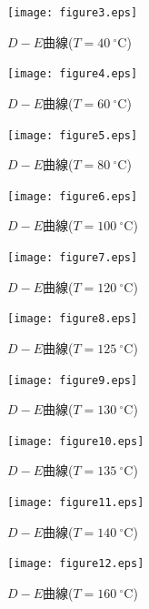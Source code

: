 \documentclass[a4paper,10.5pt]{ltjsarticle}
\begin{document}
\begin{figure}[htbp]
  \begin{minipage}[t]{0.30\linewidth}
    \centering
    \texttt{[image: figure3.eps]}
    \caption{$D-E$曲線($T=40\ ^\circ \mathrm{C}$)}
  \end{minipage}
  \begin{minipage}[t]{0.30\linewidth}
    \centering
    \texttt{[image: figure4.eps]}
    \caption{$D-E$曲線($T=60\ ^\circ \mathrm{C}$)}
  \end{minipage}
  \begin{minipage}[t]{0.30\linewidth}
    \centering
    \texttt{[image: figure5.eps]}
    \caption{$D-E$曲線($T=80\ ^\circ \mathrm{C}$)}
  \end{minipage}

  \begin{minipage}[t]{0.30\linewidth}
    \centering
    \texttt{[image: figure6.eps]}
    \caption{$D-E$曲線($T=100\ ^\circ \mathrm{C}$)}
  \end{minipage}
  \begin{minipage}[t]{0.30\linewidth}
    \centering
    \texttt{[image: figure7.eps]}
    \caption{$D-E$曲線($T=120\ ^\circ \mathrm{C}$)}
  \end{minipage}
  \begin{minipage}[t]{0.30\linewidth}
    \centering
    \texttt{[image: figure8.eps]}
    \caption{$D-E$曲線($T=125\ ^\circ \mathrm{C}$)}
  \end{minipage}

  \begin{minipage}[t]{0.30\linewidth}
    \centering
    \texttt{[image: figure9.eps]}
    \caption{$D-E$曲線($T=130\ ^\circ \mathrm{C}$)}
  \end{minipage}
  \begin{minipage}[t]{0.30\linewidth}
    \centering
    \texttt{[image: figure10.eps]}
    \caption{$D-E$曲線($T=135\ ^\circ \mathrm{C}$)}
  \end{minipage}
  \begin{minipage}[t]{0.30\linewidth}
    \centering
    \texttt{[image: figure11.eps]}
    \caption{$D-E$曲線($T=140\ ^\circ \mathrm{C}$)}
  \end{minipage}

  \begin{minipage}[t]{0.30\linewidth}
    \centering
    \texttt{[image: figure12.eps]}
    \caption{$D-E$曲線($T=160\ ^\circ \mathrm{C}$)}
  \end{minipage}
\end{figure}
\clearpage
\end{document}
